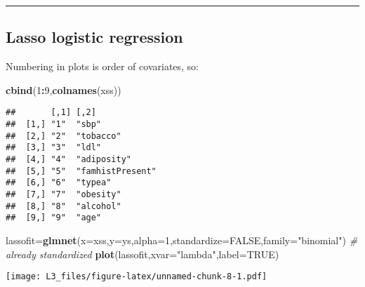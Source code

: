 \documentclass[
]{article}
\newenvironment{Shaded}{\begin{snugshade}}{\end{snugshade}}
\newcommand{\CommentTok}[1]{\textcolor[rgb]{0.56,0.35,0.01}{\textit{#1}}}
\newcommand{\DataTypeTok}[1]{\textcolor[rgb]{0.13,0.29,0.53}{#1}}
\newcommand{\DecValTok}[1]{\textcolor[rgb]{0.00,0.00,0.81}{#1}}
\newcommand{\KeywordTok}[1]{\textcolor[rgb]{0.13,0.29,0.53}{\textbf{#1}}}
\newcommand{\NormalTok}[1]{#1}
\newcommand{\OperatorTok}[1]{\textcolor[rgb]{0.81,0.36,0.00}{\textbf{#1}}}
\newcommand{\OtherTok}[1]{\textcolor[rgb]{0.56,0.35,0.01}{#1}}
\newcommand{\StringTok}[1]{\textcolor[rgb]{0.31,0.60,0.02}{#1}}
\begin{document}
\begin{center}\rule{0.5\linewidth}{0.5pt}\end{center}

\hypertarget{lasso-logistic-regression}{%
\subsection{Lasso logistic regression}\label{lasso-logistic-regression}}

Numbering in plots is order of covariates, so:

\begin{Shaded}
\begin{Highlighting}[]
\KeywordTok{cbind}\NormalTok{(}\DecValTok{1}\OperatorTok{:}\DecValTok{9}\NormalTok{,}\KeywordTok{colnames}\NormalTok{(xss))}
\end{Highlighting}
\end{Shaded}

\begin{verbatim}
##       [,1] [,2]            
##  [1,] "1"  "sbp"           
##  [2,] "2"  "tobacco"       
##  [3,] "3"  "ldl"           
##  [4,] "4"  "adiposity"     
##  [5,] "5"  "famhistPresent"
##  [6,] "6"  "typea"         
##  [7,] "7"  "obesity"       
##  [8,] "8"  "alcohol"       
##  [9,] "9"  "age"
\end{verbatim}

\begin{Shaded}
\begin{Highlighting}[]
\NormalTok{lassofit=}\KeywordTok{glmnet}\NormalTok{(}\DataTypeTok{x=}\NormalTok{xss,}\DataTypeTok{y=}\NormalTok{ys,}\DataTypeTok{alpha=}\DecValTok{1}\NormalTok{,}\DataTypeTok{standardize=}\OtherTok{FALSE}\NormalTok{,}\DataTypeTok{family=}\StringTok{"binomial"}\NormalTok{) }\CommentTok{# already standardized}
\KeywordTok{plot}\NormalTok{(lassofit,}\DataTypeTok{xvar=}\StringTok{"lambda"}\NormalTok{,}\DataTypeTok{label=}\OtherTok{TRUE}\NormalTok{)}
\end{Highlighting}
\end{Shaded}

\texttt{[image: L3\_files/figure-latex/unnamed-chunk-8-1.pdf]}

\begin{Shaded}
\end{Shaded}
\end{document}
